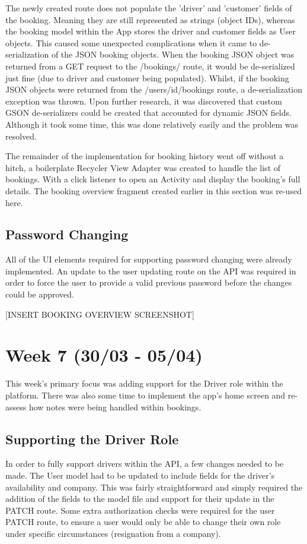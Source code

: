 The newly created route does not populate the 'driver' and 'customer' fields of the booking. Meaning they are still represented as strings (object IDs), whereas the booking model within the App stores the driver and customer fields as User objects. This caused some unexpected complications when it came to de-serialization of the JSON booking objects. When the booking JSON object was returned from a GET request to the /bookings/ route, it would be de-serialized just fine (due to driver and customer being populated). Whilst, if the booking JSON objects were returned from the /users/{id}/bookings route, a de-serialization exception was thrown. Upon further research, it was discovered that custom GSON de-serializers could be created that accounted for dynamic JSON fields. Although it took some time, this was done relatively easily and the problem was resolved.

The remainder of the implementation for booking history went off without a hitch, a boilerplate Recycler View Adapter was created to handle the list of bookings. With a click listener to open an Activity and display the booking's full details. The booking overview fragment created earlier in this section was re-used here.

\subsection{Password Changing}
All of the UI elements required for supporting password changing were already implemented. An update to the user updating route on the API was required in order to force the user to provide a valid previous password before the changes could be approved.

[INSERT BOOKING OVERVIEW SCREENSHOT]

\section{Week 7 (30/03 - 05/04)}
This week's primary focus was adding support for the Driver role within the platform. There was also some time to implement the app's home screen and re-assess how notes were being handled within bookings.

\subsection{Supporting the Driver Role}
In order to fully support drivers within the API, a few changes needed to be made. The User model had to be updated to include fields for the driver's availability and company. This was fairly straightforward and simply required the addition of the fields to the model file and support for their update in the PATCH route. Some extra authorization checks were required for the user PATCH route, to ensure a user would only be able to change their own role under specific circumstances (resignation from a company).

